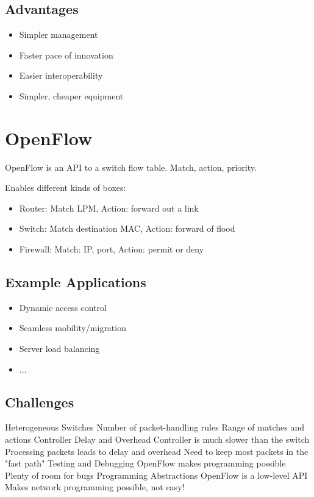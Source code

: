 \documentclass[a4paper, fontsize=8pt, landscape, DIV=1]{scrartcl}
\begin{document}
\begin{multicols*}{4}
  \subsection{Advantages}
  \begin{itemize}
    \item Simpler management
    \item Faster pace of innovation
    \item Easier interoperability
    \item Simpler, cheaper equipment
  \end{itemize}

  \section{OpenFlow}
  OpenFlow is an API to a switch flow table. Match, action, priority.

  Enables different kinds of boxes:
  \begin{itemize}
    \item Router: Match LPM, Action: forward out a link
    \item Switch: Match destination MAC, Action: forward of flood
    \item Firewall: Match: IP, port, Action: permit or deny
  \end{itemize}

  \subsection{Example Applications}
  \begin{itemize}
    \item Dynamic access control
    \item Seamless mobility/migration
    \item Server load balancing
    \item ...
  \end{itemize}

  \subsection{Challenges}
  \begin{outline}
    \1 Heterogeneous Switches
      \2 Number of packet-handling rules
      \2 Range of matches and actions
    \1 Controller Delay and Overhead
      \2 Controller is much slower than the switch
      \2 Processing packets leads to delay and overhead
      \2 Need to keep most packets in the "fast path"
    \1 Testing and Debugging
      \2 OpenFlow makes programming possible
      \2 Plenty of room for bugs
    \1 Programming Abstractions
      \2 OpenFlow is a low-level API
      \2 Makes network programming possible, not easy!
  \end{outline}


\end{multicols*}
\end{document}
